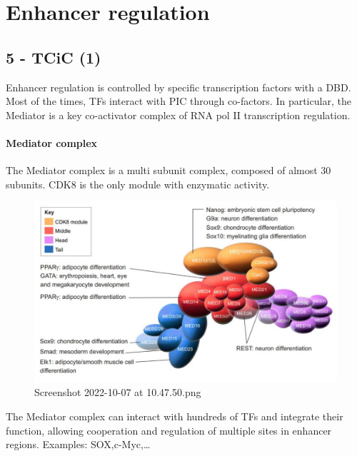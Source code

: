 \graphicspath{{chapters/_resources/}}

\chapter{Enhancer regulation}



\hypertarget{tcic-1}{%
\section{5 - TCiC (1)}\label{tcic-1}}

Enhancer regulation is controlled by specific transcription factors with a DBD. Most of the times, TFs interact with PIC through co-factors. In particular, the Mediator is a key co-activator complex of RNA pol II transcription regulation.

\hypertarget{mediator-complex}{%
\subsubsection{Mediator complex}\label{mediator-complex}}

The Mediator complex is a multi subunit complex, composed of almost 30 subunits. CDK8 is the only module with enzymatic activity.

\begin{figure}
\centering
\includegraphics[width=\textwidth]{../_resources/Screenshot_2022-10-07_at_10-47-50.png}
\caption{Screenshot 2022-10-07 at 10.47.50.png}
\end{figure}

The Mediator complex can interact with hundreds of TFs and integrate their function, allowing cooperation and regulation of multiple sites in enhancer regions. Examples: SOX,c-Myc,\ldots{}

